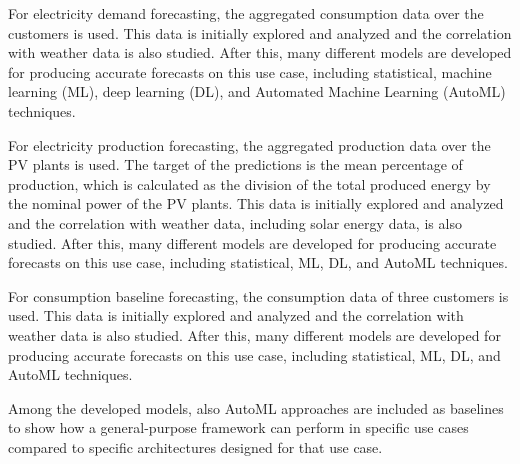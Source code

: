 For electricity demand forecasting, the aggregated consumption data over the customers is used.
This data is initially explored and analyzed and the correlation with weather data is also studied.
After this, many different models are developed for producing accurate forecasts on this use case, including statistical, machine learning (ML), deep learning (DL), and Automated Machine Learning (AutoML) techniques.

For electricity production forecasting, the aggregated production data over the PV plants is used.
The target of the predictions is the mean percentage of production, which is calculated as the division of the total produced energy by the nominal power of the PV plants.
This data is initially explored and analyzed and the correlation with weather data, including solar energy data, is also studied.
After this, many different models are developed for producing accurate forecasts on this use case, including statistical, ML, DL, and AutoML techniques.

For consumption baseline forecasting, the consumption data of three customers is used.
This data is initially explored and analyzed and the correlation with weather data is also studied.
After this, many different models are developed for producing accurate forecasts on this use case, including statistical, ML, DL, and AutoML techniques.

Among the developed models, also AutoML approaches are included as baselines to show how a general-purpose framework can perform in specific use cases compared to specific architectures designed for that use case.

